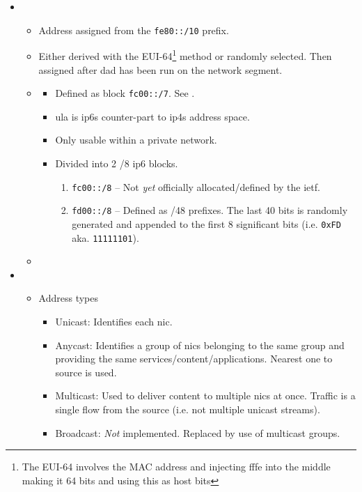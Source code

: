 \begin{itemize}
    \item {}
    \begin{itemize}
        \item Address assigned from the \texttt{fe80::/10} prefix.
        \item Either derived with the EUI-64\footnote{The EUI-64 involves the MAC address and injecting fffe into the middle making it 64 bits and using this as host bits} method or randomly selected. Then assigned after \gls{dad} has been run on the network segment.
        \item {}\cite{wiki:Unique_local_address}
        \begin{itemize}
            \item Defined as block \texttt{fc00::/7}. See .
            \item \gls{ula} is \glspl{ip6} counter-part to \glspl{ip4}  address space.
            \item Only usable within a private network.
            \item Divided into 2 /8 \gls{ip6} blocks.
            \begin{enumerate}
                \item \texttt{fc00::/8} -- Not \textit{yet} officially allocated/defined by the \gls{ietf}.
                \item \texttt{fd00::/8} -- Defined as /48 prefixes. The last 40 bits is randomly generated and appended to the first 8 significant bits {\small (i.e. \texttt{0xFD} aka. \texttt{11111101})}.
            \end{enumerate}
        \end{itemize}
        \item {}
    \end{itemize}
    \item {}
    \begin{itemize}
        \item Address types
        \begin{itemize}
            \item Unicast: Identifies each \gls{nic}.
            \item Anycast: Identifies a group of \glspl{nic} belonging to the same group and providing the same services/content/applications. Nearest one to source is used.
            \item Multicast: Used to deliver content to multiple \glspl{nic} at once. Traffic is a single flow from the source (i.e. not multiple unicast streams).
            \item Broadcast: \textit{Not} implemented. Replaced by use of multicast groups.
        \end{itemize}
    \end{itemize}
\end{itemize}

